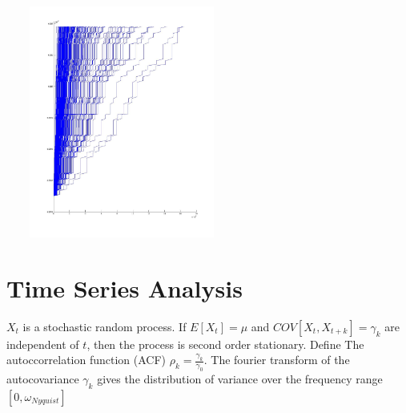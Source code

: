\includegraphics[width=3in,height=3in]{images/RealTimeFinancialTSMining/tics072007_time.jpg}





\section{Time Series Analysis}
$X_{t}$ is a stochastic random process.  If $E [X_{t} ] = \mu$
and $COV[ X_{t}, X_{t+k}] = \gamma_{k}$ are independent of $t$,
then the process is second order stationary.  Define The
autoccorrelation function (ACF) $\rho_{k}=
\frac{\gamma_{k}}{\gamma_{0}}$.  The fourier transform of the
autocovariance ${\gamma_{k} }$ gives the distribution of
variance over the frequency range $[0, \omega_{Nyquist}]$



